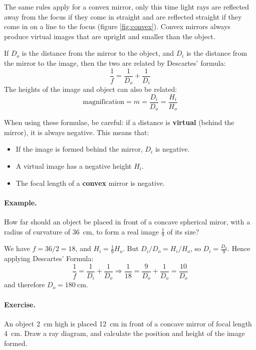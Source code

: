 \documentclass[a4paper]{amsbook}
\begin{document}
The same rules apply for a convex mirror, only this time light rays are reflected away from the focus if they come in straight and are
reflected straight if they come in on a line to the focus (figure \ref{fig:convex}). Convex mirrors always produce virtual images that
are upright and smaller than the object.

If $ D_o $ is the distance from the mirror to the object, and $ D_i $ is the distance from the mirror to the image, then
the two are related by Descartes' formula:
\begin{equation}
  \frac{1}{f} = \frac{1}{D_o} + \frac{1}{D_i}
\end{equation}
The heights of the image and object can also be related:
\begin{equation}
  \text{magnification} = m = \frac{D_i}{D_o} = \frac{H_i}{H_o}
\end{equation}

When using these formulae, be careful: if a distance is \textbf{virtual} (behind the mirror), it is always negative. This means
that:
\begin{itemize}
  \item If the image is formed behind the mirror, $ D_i $ is negative.
  \item A virtual image has a negative height $ H_i $.
  \item The focal length of a \textbf{convex} mirror is negative.
\end{itemize}

\paragraph{Example.} How far should an object be placed in front of a concave spherical miror, with a radius
of curvature of \SI{36}{\centi\metre}, to form a real image $\frac{1}{9}$ of its size?

We have $ f = 36/2 = 18 $, and $ H_i = \frac{1}{9} H_o $. But $ D_i/D_o = H_i/H_o $, so $ D_i = \frac{D_o}{9} $.
Hence applying Descartes' Formula:
\begin{displaymath}
  \frac{1}{f} = \frac{1}{D_i} + \frac{1}{D_o} \Rightarrow \frac{1}{18} = \frac{9}{D_o} + \frac{1}{D_o} = \frac{10}{D_o}
\end{displaymath}
and therefore $ D_o = \SI{180}{\centi\metre} $.

\paragraph{Exercise.} An object \SI{2}{\centi\metre} high is placed \SI{12}{\centi\metre} in front of a concave
mirror of focal length \SI{4}{\centi\metre}. Draw a ray diagram, and calculate the position and height of the
image formed.
\end{document}
